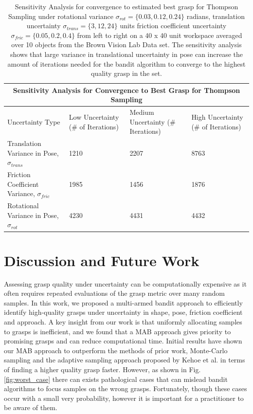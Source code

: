 \documentclass[10pt, conference]{ieeeconf}      %
\begin{document}
\begin{table}[t]
\centering
\begin{tabular}{ |p{4.5cm}||p{2cm}|p{2.5cm}|p{2cm}|  }
 \hline
 \multicolumn{4}{|c|}{Sensitivity Analysis for Convergence to Best Grasp for Thompson Sampling} \\
 \hline
Uncertainty Type & Low Uncertainty ($\#$ of Iterations) & Medium Uncertainty ($\#$ Iterations) & High Uncertainty ($\#$ of Iterations)\\
 \hline
Translation Variance in Pose, $\sigma_{trans}$ & 1210    & 2207 &  8763\\
Friction Coefficient Variance, $\sigma_{fric}$ &  1985  & 1456   & 1876\\
Rotational Variance in Pose, $\sigma_{rot}$ & 4230 & 4431 &  4432\\
 \hline
\end{tabular}
   \caption { \footnotesize  Sensitivity Analysis for convergence to estimated best grasp for Thompson Sampling under rotational variance $\sigma_{rot} = \lbrace 0.03,0.12, 0.24 \rbrace$ radians,  translation uncertainty $\sigma_{trans} = \lbrace 3, 12, 24 \rbrace$ units  friction coefficient uncertainty $\sigma_{fric} = \lbrace 0.05,0.2, 0.4 \rbrace$  from left to right on a 40 x 40 unit workspace averaged over 10 objects from the Brown Vision Lab Data set. The sensitivity analysis shows that large variance in translational uncertainty in pose can increase the amount of iterations needed for the bandit algorithm to converge to the highest quality grasp in the set. 
   }
\vspace*{-20pt}
\end{table}


\section{Discussion and Future Work } 

Assessing grasp quality under  uncertainty can be computationally expensive as it often requires repeated evaluations of the grasp metric over many random samples.
In this work, we proposed a multi-armed bandit approach to efficiently identify high-quality grasps under uncertainty in shape, pose, friction coefficient and approach. 
A key insight from our work is that uniformly allocating samples to grasps is inefficient, and we found that a MAB approach gives priority to promising grasps and can reduce computational time. Initial results have shown our MAB approach to outperform the methods of prior work, Monte-Carlo sampling and the adaptive sampling approach proposed by Kehoe et al. \cite{kehoe2012estimating} in terms of finding a higher quality grasp faster. 
 However, as shown in Fig. \ref{fig:worst_case} there can exists pathological cases that can mislead bandit algorithms to focus samples on the wrong grasps. Fortunately, though these cases occur with a small very probability, however it is important for a practitioner to be aware of them. 
\end{document}
